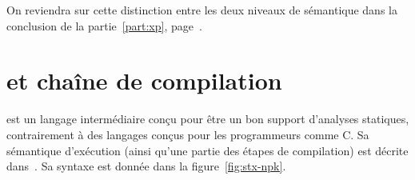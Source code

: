 On reviendra sur cette distinction entre les deux niveaux de sémantique dans la
conclusion de la partie~\ref{part:xp}, page~\pageref{page:ccl-npk-spk}.

\section{\newspeak et chaîne de compilation}
\label{sec:compil}

\newspeak est un langage intermédiaire conçu pour être un bon support d'analyses
statiques, contrairement à des langages conçus pour les programmeurs comme C. Sa
sémantique d'exécution (ainsi qu'une partie des étapes de compilation)
est décrite dans~\cite{newspeak}. Sa syntaxe est donnée dans la
figure~\ref{fig:stx-npk}.

\begin{figure}%

\def\npkstyle#1{\mathrm{#1}}


\end{figure}
